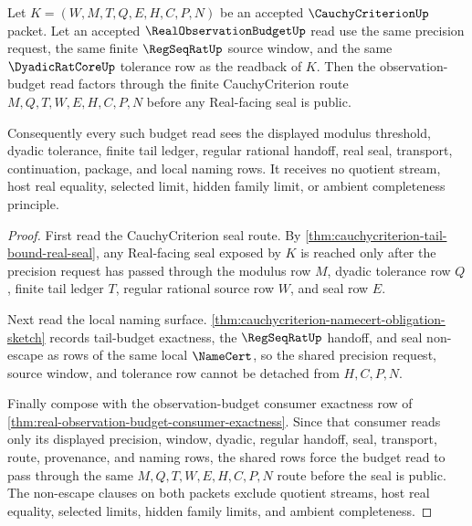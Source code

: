\begin{theorem}
\label{thm:cauchy-criterion-tail-budget-real-observation-lock}
Let $K=(W,M,T,Q,E,H,C,P,N)$ be an accepted $\CauchyCriterionUp$ packet. Let an accepted $\RealObservationBudgetUp$ read use the same precision request, the same finite $\RegSeqRatUp$ source window, and the same $\DyadicRatCoreUp$ tolerance row as the readback of $K$. Then the observation-budget read factors through the finite CauchyCriterion route $M,Q,T,W,E,H,C,P,N$ before any Real-facing seal is public.

Consequently every such budget read sees the displayed modulus threshold, dyadic tolerance, finite tail ledger, regular rational handoff, real seal, transport, continuation, package, and local naming rows. It receives no quotient stream, host real equality, selected limit, hidden family limit, or ambient completeness principle.
\end{theorem}
\begin{proof}
First read the CauchyCriterion seal route. By \autoref{thm:cauchycriterion-tail-bound-real-seal}, any Real-facing seal exposed by $K$ is reached only after the precision request has passed through the modulus row $M$, dyadic tolerance row $Q$, finite tail ledger $T$, regular rational source row $W$, and seal row $E$.

Next read the local naming surface. \autoref{thm:cauchycriterion-namecert-obligation-sketch} records tail-budget exactness, the $\RegSeqRatUp$ handoff, and seal non-escape as rows of the same local $\NameCert$, so the shared precision request, source window, and tolerance row cannot be detached from $H,C,P,N$.

Finally compose with the observation-budget consumer exactness row of \autoref{thm:real-observation-budget-consumer-exactness}. Since that consumer reads only its displayed precision, window, dyadic, regular handoff, seal, transport, route, provenance, and naming rows, the shared rows force the budget read to pass through the same $M,Q,T,W,E,H,C,P,N$ route before the seal is public. The non-escape clauses on both packets exclude quotient streams, host real equality, selected limits, hidden family limits, and ambient completeness.
\end{proof}

